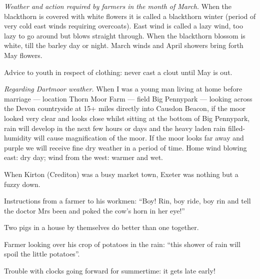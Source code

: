 

\emph{Weather and action required by farmers in the month of March.} When the
blackthorn is covered with white flowers it is called a blackthorn winter
(period of very cold east winds requiring overcoats). East wind is called a
lazy wind, too lazy to go around but blows straight through. When the
blackthorn blossom is white, till the barley day or night. March winds and
April showers bring forth May flowers.

\bigskip
\noindent Advice to youth in respect of clothing: never cast a clout until May
is out.

\bigskip
\noindent
\emph{Regarding Dartmoor weather.} When I was a young man living at home before
marriage --- location Thorn Moor Farm --- field Big Pennypark --- looking
across the Devon countryside at 15+ miles directly into Causdon Beacon, if the
moor looked very clear and looks close whilst sitting at the bottom of Big
Pennypark, rain will develop in the next few hours or days and the heavy laden
rain filled-humidity will cause magnification of the moor. If the moor looks
far away and purple we will receive fine dry weather in a period of time. Home
wind blowing east: dry day; wind from the west: warmer and wet.

\bigskip
\noindent When Kirton (Crediton) was a busy market town, Exeter was nothing but
a fuzzy down.

\bigskip
\noindent Instructions from a farmer to his workmen: ``Boy! Rin, boy ride, boy
rin and tell the doctor Mrs been and poked the cow's horn in her eye!''

\bigskip
\noindent Two pigs in a house by themselves do better than one together.

\bigskip
\noindent Farmer looking over his crop of potatoes in the rain: ``this shower of
rain will spoil the little potatoes''.

\bigskip
\noindent Trouble with clocks going forward for summertime: it gets late early!

\bigskip
\noindent